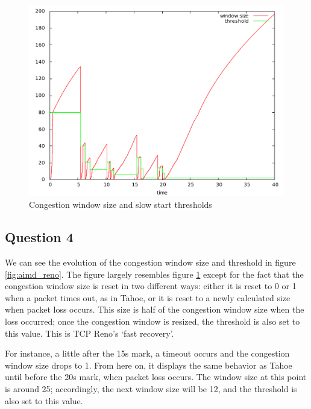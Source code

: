 \documentclass[10pt,a4paper]{article}
\begin{document}
\begin{figure}[p]
    \centering
    \includegraphics[width=\textwidth]{../part2/q2/plots/algorithm.pdf}
    \caption{Congestion window size and slow start thresholds}
    \label{fig:aimd}
\end{figure}



\subsection{Question 4}

We can see the evolution of the congestion window size and threshold
in figure \ref{fig:aimd_reno}. The figure largely resembles figure
\ref{fig:aimd} except for the fact that the congestion window size is
reset in two different ways: either it is reset to 0 or 1 when a packet
times out, as in Tahoe, or it is reset to a newly calculated size
when packet loss occurs. This size is half of the congestion window
size when the loss occurred; once the congestion window is resized,
the threshold is also set to this value. This is TCP Reno's `fast
recovery'.

For instance, a little after the 15s mark, a timeout occurs and the
congestion window size drops to 1. From here on, it displays the same
behavior as Tahoe until before the 20s mark, when packet loss occurs.
The window size at this point is around 25; accordingly, the next
window size will be 12, and the threshold is also set to this value.
\end{document}
